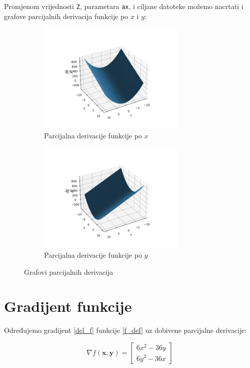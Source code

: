 Promjenom vrijednosti \verb|Z|, parametara \verb|ax|, i ciljane datoteke možemo nacrtati i grafove parcijalnih derivacija funkcije po $x$ i $y$:
\begin{figure}[H]
    \begin{subfigure}{0.5\linewidth}
        \includegraphics[width=200pt]{figures/graf_fdx.png}
        \caption{Parcijalna derivacije funkcije po $x$}
    \end{subfigure}%
    \begin{subfigure}{0.5\linewidth}
        \includegraphics[width=200pt]{figures/graf_fdy.png}
        \caption{Parcijalna derivacije funkcije po $y$}
    \end{subfigure}
    \caption{Grafovi parcijalnih derivacija}
\end{figure}

\newpage
\section{Gradijent funkcije}

Određujemo gradijent \eqref{del_f} funkcije \eqref{f_def} uz dobivene parcijalne derivacije:

\begin{equation}
    \label{del_f_value}
    \nabla f(\mathbf{x}, \mathbf{y}) = \begin{bmatrix}
        6x^2 - 36y \\
        6y^2 - 36x
    \end{bmatrix}
\end{equation}

